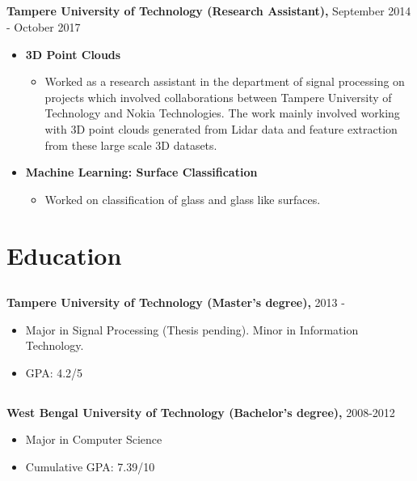 \documentclass{article}
\begin{document}
\subsection{}
\textbf{Tampere University of Technology (Research Assistant),} September 2014 -
  October 2017
\begin{itemize}[label={}]
  \item \textbf{3D Point Clouds}
    \begin{itemize}[label={--}]
      \item Worked as a research assistant in the department of signal processing
        on projects which involved collaborations between Tampere University of
        Technology and Nokia Technologies.  The work mainly involved working with
        3D point clouds generated from Lidar data and feature extraction from these
        large scale 3D datasets.
    \end{itemize}
  \item \textbf{Machine Learning: Surface Classification}
    \begin{itemize}[label={--}]
      \item Worked on classification of glass and glass like surfaces. 
    \end{itemize}
\end{itemize}

\section{Education}
\subsection{}
\textbf{Tampere University of Technology (Master's degree),} 2013 - 
\begin{itemize}[label={--}]
  \itemsep0em 
  \item Major in Signal Processing (Thesis pending). Minor in Information
    Technology.
  \item GPA: 4.2/5
\end{itemize}

\subsection{}
\textbf{West Bengal University of Technology (Bachelor's degree),} 2008-2012
\begin{itemize}[label={--}]
  \itemsep0em 
  \item Major in Computer Science
  \item Cumulative GPA: 7.39/10
\end{itemize}
\end{document}
